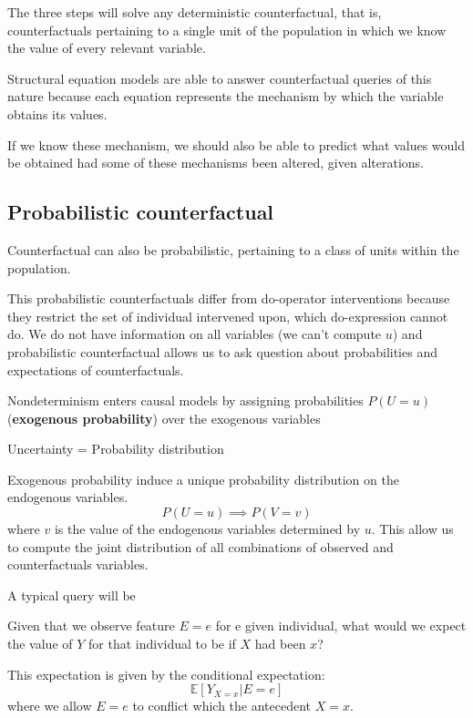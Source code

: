 The three steps will solve any deterministic counterfactual, that is, counterfactuals
pertaining to a single unit of the population in which we know the value of every
relevant variable.

Structural equation models are able to answer counterfactual queries of this nature
because each equation represents the mechanism by which the variable obtains its
values.

If we know these mechanism, we should also be able to predict what values would
be obtained had some of these mechanisms been altered, given alterations.

\subsection{Probabilistic counterfactual}
Counterfactual can also be probabilistic, pertaining to a class of units within
the population.

This probabilistic counterfactuals differ from do-operator interventions because
they restrict the set of individual intervened upon, which do-expression cannot do.
We do not have information on all variables (we can't compute $u$) and probabilistic
counterfactual allows us to ask question about probabilities and expectations of
counterfactuals.

Nondeterminism enters causal models by assigning probabilities $P(U = u)$
(\textbf{exogenous probability}) over the exogenous variables
\begin{center}
    Uncertainty = Probability distribution
\end{center}

Exogenous probability induce a unique probability distribution on the endogenous
variables.
\begin{equation*}
    P(U = u) \implies P(V = v)
\end{equation*}
where $v$ is the value of the endogenous variables determined by $u$. This allow
us to compute the joint distribution of all combinations of observed and
counterfactuals variables.

A typical query will be
\begin{center}
    Given that we observe feature $E = e$ for e given individual, what would we
    expect the value of $Y$ for that individual to be if $X$ had been $x$?
\end{center}
This expectation is given by the conditional expectation:
\begin{equation*}
    \mathbb{E}[Y_{X = x} | E = e]
\end{equation*}
where we allow $E = e$ to conflict which the antecedent $X = x$.

